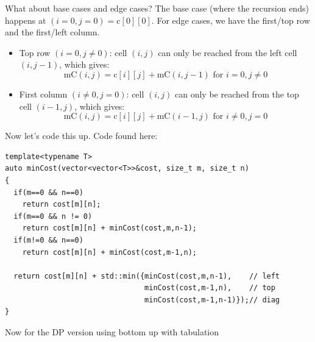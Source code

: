 What about base cases and edge cases? The base case (where the recursion
ends) happens at $(i=0,j=0) =\text{c}[0][0]$. For edge cases, we have the
first/top row and the first/left column.
\begin{itemize}%
\item Top row $(i=0,j\neq0)$: cell $(i,j)$ can only be reached from the left
  cell $(i,j-1)$, which gives:
  \begin{equation*}
  \text{mC}(i,j) = \text{c}[i][j]+\text{mC}(i,j-1) \text{ for $i=0,j\neq0$}
  \end{equation*}
\item First column $(i\neq0,j=0)$: cell $(i,j)$ can only be reached from the
  top cell $(i-1,j)$, which gives:
  \begin{equation*}
  \text{mC}(i,j) = \text{c}[i][j]+\text{mC}(i-1,j) \text{ for $i\neq0,j=0$}
  \end{equation*}
\end{itemize}
Now let's code this up. Code found here:\\
\begin{lstlisting}[style=raycppnewsnippet]
template<typename T>
auto minCost(vector<vector<T>>&cost, size_t m, size_t n)
{
  if(m==0 && n==0)
    return cost[m][n];
  if(m==0 && n != 0)
    return cost[m][n] + minCost(cost,m,n-1);
  if(m!=0 && n==0)
    return cost[m][n] + minCost(cost,m-1,n);

  return cost[m][n] + std::min({minCost(cost,m,n-1),    // left
                                minCost(cost,m-1,n),    // top
                                minCost(cost,m-1,n-1)});// diag
}
\end{lstlisting}
Now for the DP version using bottom up with tabulation
